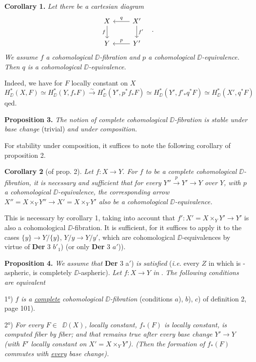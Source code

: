 \textbf{Corollary 1.} \textit{Let there be a cartesian diagram}
\[
\begin{tikzcd}
X & X' \arrow[l, "q"'] \arrow[d, "f'"] \\
Y & Y' \arrow[l, "p"']
\arrow[from=1-1, to=2-1, "f"']
\end{tikzcd}
\quad .
\]
\textit{We assume $f$ a cohomological $\DD$-fibration and $p$ a cohomological $\DD$-equivalence. Then $q$ is a cohomological $\DD$-equivalence.}

Indeed, we have for $F$ locally constant on $X$
\[
H^*_{\DD}(X,F) \simeq H^*_{\DD}(Y, f_*F) \overset{\sim}{\longrightarrow} H^*_{\DD}(Y', p^*f_*F) \simeq H^*_{\DD}(Y', f'_*q^*F) \simeq H^*_{\DD}(X', q^*F)
\]
qed.

\textbf{Proposition 3.} \textit{The notion of complete cohomological $\DD$-fibration is stable under base change} (trivial) \textit{and under composition.}

For stability under composition, it suffices to note the following corollary of proposition 2.

\textbf{Corollary 2} (of prop. 2). \textit{Let $f : X \to Y$. For $f$ to be a complete cohomological $\DD$-fibration, it is necessary and sufficient that for every $Y'' \overset{p}{\to} Y' \to Y$ over $Y$, with $p$ a cohomological $\DD$-equivalence, the corresponding arrow $X'' = X \times_Y Y'' \longrightarrow X' = X \times_Y Y'$ also be a cohomological $\DD$-equivalence.}

This is necessary by corollary 1, taking into account that $f' : X' = X \times_Y Y' \to Y'$ is also a cohomological $\DD$-fibration. It is sufficient, for it suffices to apply it to the cases $\{y\} \to Y/\{y\}$, $Y/y \to Y/y'$, which are cohomological $\DD$-equivalences by
virtue of \textbf{Der} 3 $b'_1$) (or only \textbf{Der} 3 $a'$)).


\textbf{Proposition 4.} \textit{We assume that} \textbf{Der} 3 a$'$) \textit{is satisfied} (\textit{i.e.} every $Z$ in \Dia{} which is \Hot-aspheric, is completely $\DD$-aspheric). \textit{Let $f : X \to Y$ in} \Dia. \textit{The following conditions are equivalent}

1°) \textit{$f$ is a \underline{complete} cohomological $\DD$-fibration} (conditions $a$), $b$), $c$) of definition 2, page 101).

2°) \textit{For every $F \in$} \Ob\,$\DD(X)$\textit{, locally constant, $f_*(F)$ is locally constant, is computed fiber by fiber; and that remains true after every base change $Y' \to Y$ (with $F'$ locally constant on $X' = X \times_Y Y'$). (Then the formation of $f_*(F)$ commutes with \underline{every} base change).}

